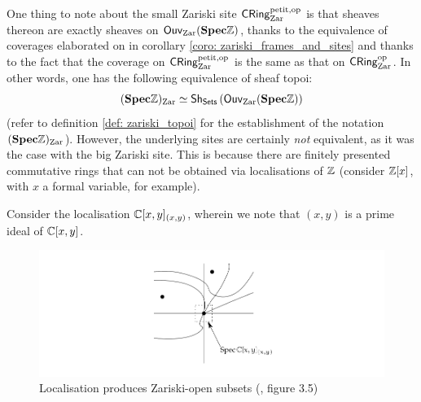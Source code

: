 \begin{remark}
                        One thing to note about the small Zariski site $\mathsf{CRing}^{\mathrm{petit}, \mathrm{op}}_{\mathrm{Zar}}$ is that sheaves thereon are exactly sheaves on $\mathsf{Ouv}_{\mathrm{Zar}}(\mathbf{Spec} \mathbb{Z})$, thanks to the equivalence of coverages elaborated on in corollary \ref{coro: zariski_frames_and_sites} and thanks to the fact that the coverage on $\mathsf{CRing}^{\mathrm{petit}, \mathrm{op}}_{\mathrm{Zar}}$ is the same as that on $\mathsf{CRing}^{\mathrm{op}}_{\mathrm{Zar}}$. In other words, one has the following equivalence of sheaf topoi:
                            $$(\mathbf{Spec} \mathbb{Z})_{\mathrm{Zar}} \simeq \mathsf{Sh}_{\mathsf{Sets}}\left(\mathsf{Ouv}_{\mathrm{Zar}}(\mathbf{Spec} \mathbb{Z})\right)$$
                        (refer to definition \ref{def: zariski_topoi} for the establishment of the notation $(\mathbf{Spec} \mathbb{Z})_{\mathrm{Zar}}$). However, the underlying sites are certainly \textit{not} equivalent, as it was the case with the big Zariski site. This is because there are finitely presented commutative rings that can not be obtained via localisations of $\mathbb{Z}$ (consider $\mathbb{Z}[x]$, with $x$ a formal variable, for example). 
                    \end{remark}
                    \begin{example}
                        Consider the localisation $\mathbb{C}[x, y]_{(x, y)}$, wherein we note that $(x, y)$ is a prime ideal of $\mathbb{C}[x,y]$. 
                            \begin{figure}[H]
                                \centering
                                \includegraphics[width=\linewidth,height=\textheight,keepaspectratio]{Figures/localisation.png}
                                \caption{Localisation produces Zariski-open subsets (\cite{risingsea}, figure 3.5)}
                                \label{fig: zariski_open_via_localisation}
                            \end{figure}
                    \end{example}
                    
